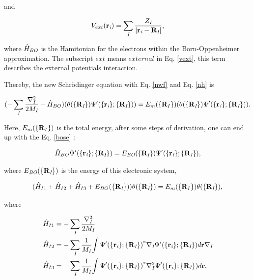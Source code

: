 \documentclass[a4paper, 12pt, titlepage,oneside,drop]{kthesis}
\begin{document}
and

\begin{equation}\label{vext}
V_{ext}(\textbf{r}_{\textit{i}}) =  \sumi<I> \frac{Z_\textit{I}}{|\textbf{r}_\textit{i}-\textbf{R}_\textit{I}|},
\end{equation}

where ${\hat{H}}_\textit{BO}$  is the Hamitonian for the electrons within the Born-Oppenheimer approximation. The subscript $ext$ means $external$ in Eq. \ref{vext}, this term describes the external potentials interaction. 

Thereby, the new Schrödinger equation with Eq. \ref{nwf} and Eq. \ref{nh} is 

\begin{equation}
 (- \sumi<I> \frac{{{\nabla}_{\textit{I}}^{2}}}{2 M_\textit{I}} + {\hath}_{BO} ) ({\theta(\{{\textbf R}_{\textit I}\})} {\Psi'(\{\textbf{r}_{\textit i}\}; \{{\textbf R}_{\textit I}\})}) = E_{m}(\{{\textbf R_I}\}) ({\theta(\{{\textbf R}_{\textit I}\})} {\Psi'(\{\textbf{r}_{\textit i}\}; \{{\textbf R}_{\textit I}\})}).
\end{equation}
 
\noindent Here, $E_{m}(\{{\textbf R_I}\})$ is the total energy, after some steps of derivation, one can end up with the Eq. \ref{bose} :

\begin{equation}\label{bose}
{\hat{H}}_{BO} {\Psi'(\{\textbf{r}_{\textit i}\}; \{{\textbf R}_{\textit I}\})} = E_\textit{BO}{(\{\textbf{R}_{\textit I}\})} {\Psi'(\{\textbf{r}_{\textit i}\}; \{{\textbf R}_{\textit I}\})},
\end{equation}

\noindent where $E_\textit{BO}{(\{\textbf{R}_{\textit I}\})}$ is the energy of this electronic system,

\begin{equation}\label{ise}
( \hat{H}_{I1}+\hat{H}_{I2}+\hat{H}_{I3}+E_{BO}(\{{\textbf R}_{\textit I}\}) ) {\theta(\{\textbf{R}_{\textit I}\})} = E_{m}(\{{\textbf R_I}\}) {\theta(\{\textbf{R}_{\textit I}\})},
\end{equation}

where

\begin{equation}\begin{split}
 &  \hat{H}_{I1} = - \sumi<I> \frac{{{\nabla}_{\textit{I}}^{2}}}{2 M_\textit{I}}   \\
 &  \hat{H}_{I2} = - \sumi<I> \frac{1}{M_\textit{I}} {\int {\Psi'(\{\textbf{r}_{\textit{i}}\}; \{\textbf{R}_{\textit I}\})}^{\ast} {{\nabla}_{\textit{I}}} {{\Psi'(\{\textbf{r}_{\textit{i}} \}; \{\textbf{R}_{\textit I}\})}} d {\textbf r }} {{\nabla}_{\textit{I}}}  \\
 &  \hat{H}_{I3} = - \sumi<I> \frac{1}{M_\textit{I}} {\int {{\Psi'(\{\textbf{r}_{\textit{i}}\}; \{\textbf{R}_{\textit I}\})}}^{\ast} {{\nabla}_{\textit{I}}^{2}} {{\Psi'(\{\textbf{r}_{\textit{i}} \}; \{\textbf{R}_{\textit I}\})}} d {\textbf r }}. 
\end{split}\end{equation}
\end{document}
